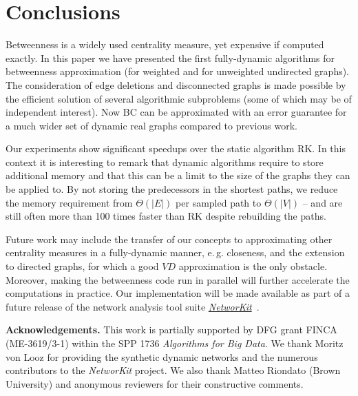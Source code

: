 \documentclass[english]{llncs}
\newcommand{\eg}{e.\,g.\xspace}
\newcommand{\vd}{$\mathit{VD}$\xspace}
\newcommand{\rk}{\textsf{RK}\xspace}
\begin{document}
\section{Conclusions}
Betweenness is a widely used centrality measure, yet expensive if computed exactly.
In this paper we have presented the first fully-dynamic algorithms for betweenness approximation  
(for weighted and for unweighted undirected graphs). 
The consideration of edge deletions and disconnected graphs is made possible by the efficient solution
of several algorithmic subproblems (some of which may be of independent interest).
Now BC can be approximated with an error guarantee for a much wider 
set of dynamic real graphs compared to previous work. 


Our experiments show significant speedups over the static algorithm \rk. In this context it is interesting
to remark that dynamic algorithms require to store additional memory and that this can be a limit to the size 
of the graphs they can be applied to. 
By not storing the predecessors in the shortest paths, we reduce the memory requirement from $\Theta(|E|)$ per 
sampled path to $\Theta(|V|)$ -- and are still often more than 100 times faster than \rk despite rebuilding the paths.


Future work may include the transfer of our concepts to approximating other centrality measures in a fully-dynamic
manner, \eg closeness, and the extension to directed graphs, for which a good \vd approximation is the only obstacle.
Moreover, making the betweenness code run in parallel will further accelerate the
computations in practice.
Our implementation will be made available as part of a future release of the network analysis tool suite 
\href{http://networkit.iti.kit.edu}{\textit{NetworKit}}~\cite{DBLP:journals/corr/StaudtSM14}.


\bigskip

\renewcommand{\baselinestretch}{0.25}
\begin{scriptsize}
\textbf{Acknowledgements.}
This work is partially supported by DFG grant FINCA (ME-3619/3-1) within the SPP 1736 \emph{Algorithms for Big Data}.
We thank Moritz von Looz for providing the synthetic dynamic networks and the numerous contributors to 
the \textit{NetworKit} project. We also thank Matteo Riondato (Brown University) and anonymous reviewers for their constructive comments.
\end{scriptsize}
\renewcommand{\baselinestretch}{1.0}



\end{document}
